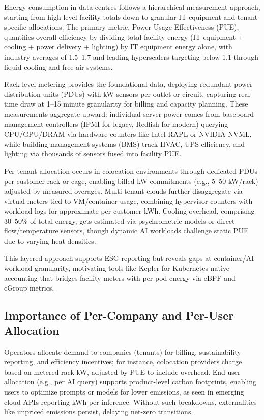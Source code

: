 Energy consumption in data centres follows a hierarchical measurement approach, starting from high-level facility totals down to granular IT equipment and tenant-specific allocations. The primary metric, Power Usage Effectiveness (PUE), quantifies overall efficiency by dividing total facility energy (IT equipment + cooling + power delivery + lighting) by IT equipment energy alone, with industry averages of 1.5--1.7 and leading hyperscalers targeting below 1.1 through liquid cooling and free-air systems.

Rack-level metering provides the foundational data, deploying redundant power distribution units (PDUs) with kW sensors per outlet or circuit, capturing real-time draw at 1--15 minute granularity for billing and capacity planning. These measurements aggregate upward: individual server power comes from baseboard management controllers (IPMI for legacy, Redfish for modern) querying CPU/GPU/DRAM via hardware counters like Intel RAPL or NVIDIA NVML, while building management systems (BMS) track HVAC, UPS efficiency, and lighting via thousands of sensors fused into facility PUE.\@

Per-tenant allocation occurs in colocation environments through dedicated PDUs per customer rack or cage, enabling billed kW commitments (e.g., 5--50 kW/rack) adjusted by measured overages. Multi-tenant clouds further disaggregate via virtual meters tied to VM/container usage, combining hypervisor counters with workload logs for approximate per-customer kWh. Cooling overhead, comprising 30--50\% of total energy, gets estimated via psychrometric models or direct flow/temperature sensors, though dynamic AI workloads challenge static PUE due to varying heat densities.

This layered approach supports ESG reporting but reveals gaps at container/AI workload granularity, motivating tools like Kepler for Kubernetes-native accounting that bridges facility meters with per-pod energy via eBPF and cGroup metrics.


\subsection{Importance of Per-Company and Per-User Allocation}
Operators allocate demand to companies (tenants) for billing, 
sustainability reporting, and efficiency incentives; for instance, 
colocation providers charge based on metered rack kW, adjusted by PUE 
to include overhead. End-user allocation (e.g., per AI query) supports 
product-level carbon footprints, enabling users to optimize prompts or models 
for lower emissions, as seen in emerging cloud APIs reporting kWh per inference. 
Without such breakdowns, externalities like unpriced emissions persist, delaying 
net-zero transitions.  

